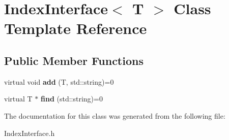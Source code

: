 \section{Index\+Interface$<$ T $>$ Class Template Reference}
\label{class_index_interface}
\subsection*{Public Member Functions}
\begin{DoxyCompactItemize}
\item 
virtual void {\bfseries add} (T, std\+::string)=0\label{class_index_interface_af565b2ad613b3506b1c51332f3d5c553}

\item 
virtual T $\ast$ {\bfseries find} (std\+::string)=0\label{class_index_interface_a2363614c8d270d26fef72c2b60293d14}

\end{DoxyCompactItemize}


The documentation for this class was generated from the following file\+:\begin{DoxyCompactItemize}
\item 
Index\+Interface.\+h\end{DoxyCompactItemize}

